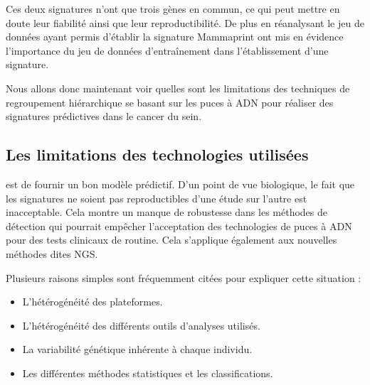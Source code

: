 			Ces deux signatures n'ont que trois gènes en commun, ce qui peut mettre en doute leur fiabilité ainsi que leur reproductibilité.
			De plus \citeauthor{Michiels2005} en réanalysant le jeu de données ayant permis d'établir la signature Mammaprint ont mis en évidence l'importance du jeu de données d'entraînement dans l'établissement d'une signature.

			Nous allons donc maintenant voir quelles sont les limitations des techniques de regroupement hiérarchique se basant sur les puces à \acs{ADN} pour réaliser des signatures prédictives dans le cancer du sein.

		\subsection{\textcolor{red!45!black}{Les limitations des technologies utilisées}}
			 est de fournir un bon modèle prédictif.
			D'un point de vue biologique, le fait que les signatures ne soient pas reproductibles d'une étude sur l'autre est inacceptable.
			Cela montre un manque de robustesse dans les méthodes de détection qui pourrait empêcher l'acceptation des technologies de puces à \acs{ADN} pour des tests clinicaux de routine.
			Cela s'applique également aux nouvelles méthodes dites \ac{NGS}.

			Plusieurs raisons simples sont fréquemment citées pour expliquer cette situation :
			\begin{itemize}
				\item L'hétérogénéité des plateformes.
				\item L'hétérogénéité des différents outils d'analyses utilisés.
				\item La variabilité génétique inhérente à chaque individu.
				\item Les différentes méthodes statistiques et les classifications.
			\end{itemize}

